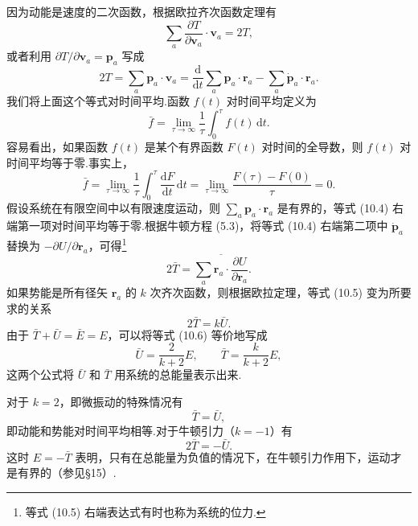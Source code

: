 因为动能是速度的二次函数，根据欧拉齐次函数定理有
\begin{equation*}
  \sum_a\frac{\partial T}{\partial\boldsymbol{v}_a}\cdot\boldsymbol{v}_a=2T,
\end{equation*}
或者利用 $\partial T/\partial\boldsymbol{v}_a=\boldsymbol{p}_a$ 写成
\begin{equation}
  2T=\sum_a\boldsymbol{p}_a\cdot\boldsymbol{v}_a
  =\frac{\mathrm{d}}{\mathrm{d}t}\sum_a\boldsymbol{p}_a\cdot\boldsymbol{r}_a
  -\sum_a\dot{\boldsymbol{p}}_a\cdot\boldsymbol{r}_a.
\end{equation}
我们将上面这个等式对时间平均.函数 $f(t)$ 对时间平均定义为
\begin{equation*}
  \bar{f}=\lim_{\tau\to\infty}\frac{1}{\tau}\int_0^{\tau}f(t)\,\mathrm{d}t.
\end{equation*}
容易看出，如果函数 $f(t)$ 是某个有界函数 $F(t)$ 对时间的全导数，则 $f(t)$ 对时间平均等于零.事实上，
\begin{equation*}
  \bar{f}=\lim_{\tau\to\infty}\frac{1}{\tau}\int_0^{\tau}\frac{\mathrm{d}F}{\mathrm{d}t}\,\mathrm{d}t
  =\lim_{\tau\to\infty}\frac{F(\tau)-F(0)}{\tau}=0.
\end{equation*}
假设系统在有限空间中以有限速度运动，则 $\sum_a\boldsymbol{p}_a\cdot\boldsymbol{r}_a$ 是有界的，等式 (10.4) 右端第一项对时间平均等于零.根据牛顿方程 (5.3)，将等式 (10.4) 右端第二项中 $\dot{\boldsymbol{p}}_a$ 替换为 $-\partial U/\partial\boldsymbol{r}_a$，可得\footnote{等式 (10.5) 右端表达式有时也称为系统的位力.}
\begin{equation}
  2\bar{T}=\overline{\sum_a\boldsymbol{r}_a\cdot\frac{\partial U}{\partial\boldsymbol{r}_a}}.
\end{equation}
如果势能是所有径矢 $\boldsymbol{r}_a$ 的 $k$ 次齐次函数，则根据欧拉定理，等式 (10.5) 变为所要求的关系
\begin{equation}
  2\bar{T}=k\bar{U}.
\end{equation}
由于 $\bar{T}+\bar{U}=\bar{E}=E$，可以将等式 (10.6) 等价地写成
\begin{equation}
  \bar{U}=\frac{2}{k+2}E,\qquad
  \bar{T}=\frac{k}{k+2}E,
\end{equation}
这两个公式将 $\bar{U}$ 和 $\bar{T}$ 用系统的总能量表示出来.

对于 $k=2$，即微振动的特殊情况有
\begin{equation*}
  \bar{T}=\bar{U},
\end{equation*}
即动能和势能对时间平均相等.对于牛顿引力（$k=-1$）有
\begin{equation*}
  2\bar{T}=-\bar{U}.
\end{equation*}
这时 $E=-\bar{T}$ 表明，只有在总能量为负值的情况下，在牛顿引力作用下，运动才是有界的（参见§15）.

